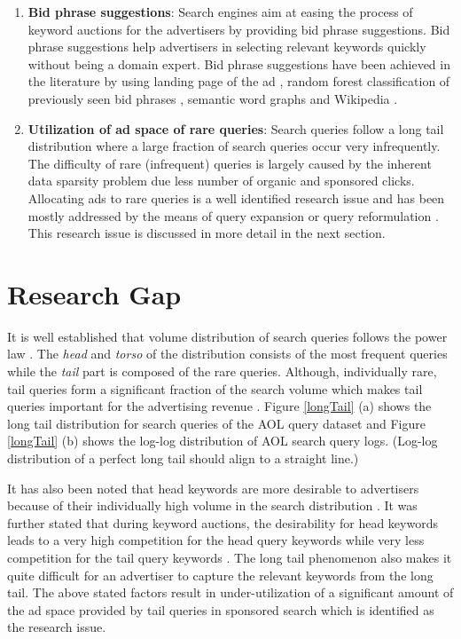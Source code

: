 \begin{enumerate}[label=(\roman*).]
    
    \item{\textbf{Bid phrase suggestions}}: Search engines aim at easing the process of keyword auctions for the advertisers by providing bid phrase suggestions. Bid phrase suggestions help advertisers in selecting relevant keywords quickly without being a domain expert. Bid phrase suggestions have been achieved in the literature by using landing page of the ad \cite{ravi2010automatic}, random forest classification of previously seen bid phrases \cite{agrawal2013multi}, semantic word graphs \cite{abhishek2007keyword} and Wikipedia \cite{jadidinejad2014advertising}.
    
    \item{\textbf{Utilization of ad space of rare queries}}: Search queries follow a long tail distribution where a large fraction of search queries occur very infrequently. The difficulty of rare (infrequent) queries is largely caused by the inherent data sparsity problem due less number of organic and sponsored clicks. Allocating ads to rare queries is a well identified research issue and has been mostly addressed by the means of query expansion \cite{broder2009online} or query reformulation \cite{sordoni2015hierarchical}. This research issue is discussed in more detail in the next section.
    
    

\end{enumerate}


\section{Research Gap}
It is well established that volume distribution of search queries follows the power law \cite{broder2009online}. The {\it head} and {\it torso} of the distribution consists of the most frequent queries while the {\it tail} part is composed of the rare queries. Although, individually rare, tail queries form a significant fraction of the search volume which makes tail queries important for the advertising revenue \cite{broder2009online}. Figure \ref{longTail} (a) shows the long tail distribution for search queries of the AOL query dataset and Figure \ref{longTail} (b) shows the log-log distribution of AOL search query logs. (Log-log distribution of a perfect long tail should align to a straight line.)

It has also been noted that head keywords are more desirable to advertisers because of their individually high volume in the search distribution \cite{rutz2011zooming}. It was further stated that during keyword auctions, the desirability for head keywords leads to a very high competition for the head query keywords while very less competition for the tail query keywords \cite{rutz2011zooming}. The long tail phenomenon also makes it quite difficult for an advertiser to capture the relevant keywords from the long tail. The above stated factors result in under-utilization of a significant amount of the ad space provided by tail queries in sponsored search which is identified as the research issue. 

